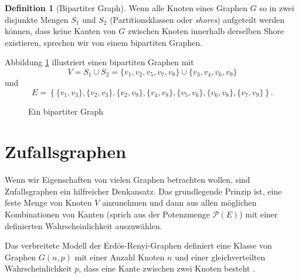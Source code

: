 \documentclass[11pt,abstracton]{scrreprt} %
\theoremstyle{definition}
\newtheorem{definition}{Definition}
\begin{document}
\begin{definition}[Bipartiter Graph]
Wenn alle Knoten eines Graphen $G$ so in zwei disjunkte Mengen $S_1$ und $S_2$ (Partitionsklassen oder {\sl shores}) aufgeteilt werden können, dass keine Kanten von $G$ zwischen Knoten innerhalb derselben Shore existieren, sprechen wir von einem bipartiten Graphen.
\end{definition}

Abbildung \ref{bipartGraph} illustriert einen bipartiten Graphen mit
\[
	V = S_1 \cup S_2 = \{v_1,v_2,v_5,v_7,v_8\} \cup \{ v_3,v_4,v_6,v_9 \}
\]
und
\[
	E = \left\{  \{v_1,v_3\}, \{v_2,v_3\}, \{v_2,v_9\}, \{v_4,v_8\}, \{v_5,v_6\}, \{ v_6,v_8 \}, \{ v_7,v_9 \}  \right\}.
\]

\begin{figure}
\caption{Ein bipartiter Graph}
\label{bipartGraph}
\begin{center}


\end{center}
\end{figure}

\section{Zufallsgraphen}

Wenn wir Eigenschaften von vielen Graphen betrachten wollen, sind Zufallsgraphen ein hilfreicher Denkansatz. Das grundlegende Prinzip ist, eine feste Menge von Knoten $V$ anzunehmen und dann aus allen möglichen Kombinationen von Kanten (sprich aus der Potenzmenge $\mathcal{P}(E)$) mit einer definierten Wahrscheinlichkeit auszuwählen.

\bigskip
Das verbreitete Modell der Erdös-Renyi-Graphen definiert eine Klasse von Graphen $G(n, p)$ mit einer Anzahl Knoten $n$ und einer gleichverteilten Wahrscheinlichkeit $p$, dass eine Kante zwischen zwei Knoten besteht \cite{erdos}.
\end{document}
